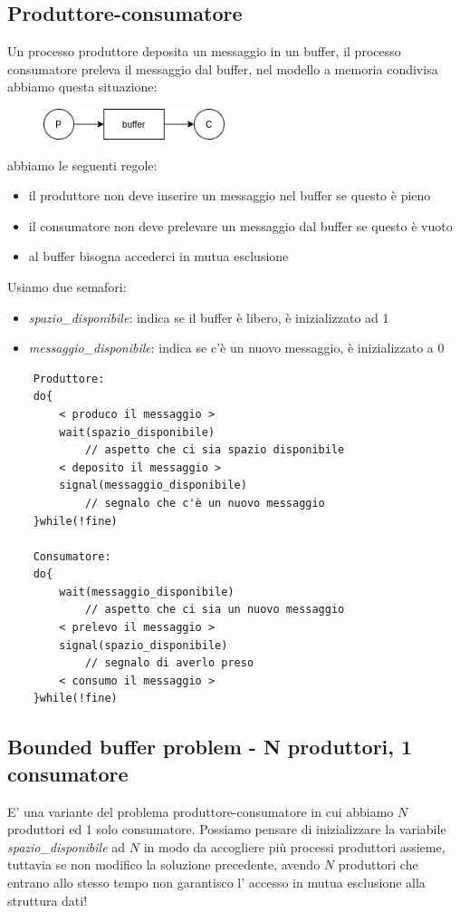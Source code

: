\subsection{Produttore-consumatore}
Un processo produttore deposita un messaggio in un buffer, il processo consumatore preleva il messaggio dal buffer, nel modello a memoria condivisa abbiamo questa situazione:
\begin{figure}[H]
    \centering
    \includegraphics[width=200px]{images/6_Sincronizzazione_tra_processi/produttore-consumatore.png}
\end{figure}
abbiamo le seguenti regole:
\begin{itemize}
    \item il produttore non deve inserire un messaggio nel buffer se questo è pieno
    \item il consumatore non deve prelevare un messaggio dal buffer se questo è vuoto
    \item al buffer bisogna accederci in mutua esclusione
\end{itemize}
Usiamo due semafori:
\begin{itemize}
    \item \emph{spazio\_disponibile}: indica se il buffer è libero, è inizializzato ad 1
    \item \emph{messaggio\_disponibile}: indica se c'è un nuovo messaggio, è inizializzato a 0
\end{itemize}
\begin{verbatim}
    Produttore:
    do{
        < produco il messaggio >
        wait(spazio_disponibile)
            // aspetto che ci sia spazio disponibile
        < deposito il messaggio >
        signal(messaggio_disponibile)
            // segnalo che c'è un nuovo messaggio
    }while(!fine)
    
    Consumatore:
    do{
        wait(messaggio_disponibile)
            // aspetto che ci sia un nuovo messaggio
        < prelevo il messaggio >
        signal(spazio_disponibile)
            // segnalo di averlo preso
        < consumo il messaggio >
    }while(!fine)
\end{verbatim}

\subsection{Bounded buffer problem - N produttori, 1 consumatore}
E' una variante del problema produttore-consumatore in cui abbiamo $N$ produttori ed 1 solo consumatore.
Possiamo pensare di inizializzare la variabile \emph{spazio\_disponibile} ad $N$ in modo da accogliere più processi produttori assieme, tuttavia se non modifico la soluzione precedente, avendo $N$ produttori che entrano allo stesso tempo non garantisco l' accesso in mutua esclusione alla struttura dati!

